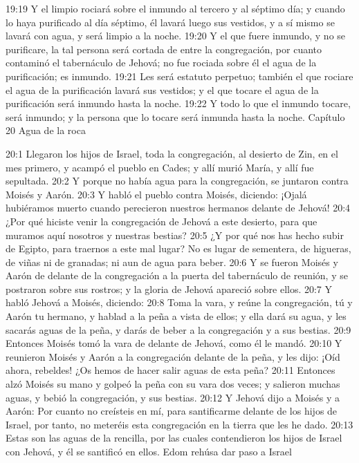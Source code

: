 19:19 Y el limpio rociará sobre el inmundo al tercero y al séptimo día; y cuando lo haya purificado al día séptimo, él lavará luego sus vestidos, y a sí mismo se lavará con agua, y será limpio a la noche.  
19:20 Y el que fuere inmundo, y no se purificare, la tal persona será cortada de entre la congregación, por cuanto contaminó el tabernáculo de Jehová; no fue rociada sobre él el agua de la purificación; es inmundo.  
19:21 Les será estatuto perpetuo; también el que rociare el agua de la purificación lavará sus vestidos; y el que tocare el agua de la purificación será inmundo hasta la noche.  
19:22 Y todo lo que el inmundo tocare, será inmundo; y la persona que lo tocare será inmunda hasta la noche.  
Capítulo 20
Agua de la roca  

20:1 Llegaron los hijos de Israel, toda la congregación, al desierto de Zin, en el mes primero, y acampó el pueblo en Cades; y allí murió María, y allí fue sepultada.  
20:2 Y porque no había agua para la congregación, se juntaron contra Moisés y Aarón.  
20:3 Y habló el pueblo contra Moisés, diciendo: ¡Ojalá hubiéramos muerto cuando perecieron nuestros hermanos delante de Jehová!  
20:4 ¿Por qué hiciste venir la congregación de Jehová a este desierto, para que muramos aquí nosotros y nuestras bestias?  
20:5 ¿Y por qué nos has hecho subir de Egipto, para traernos a este mal lugar? No es lugar de sementera, de higueras, de viñas ni de granadas; ni aun de agua para beber.  
20:6 Y se fueron Moisés y Aarón de delante de la congregación a la puerta del tabernáculo de reunión, y se postraron sobre sus rostros; y la gloria de Jehová apareció sobre ellos.  
20:7 Y habló Jehová a Moisés, diciendo:  
20:8 Toma la vara, y reúne la congregación, tú y Aarón tu hermano, y hablad a la peña a vista de ellos; y ella dará su agua, y les sacarás aguas de la peña, y darás de beber a la congregación y a sus bestias.  
20:9 Entonces Moisés tomó la vara de delante de Jehová, como él le mandó.  
20:10 Y reunieron Moisés y Aarón a la congregación delante de la peña, y les dijo: ¡Oíd ahora, rebeldes! ¿Os hemos de hacer salir aguas de esta peña?  
20:11 Entonces alzó Moisés su mano y golpeó la peña con su vara dos veces; y salieron muchas aguas, y bebió la congregación, y sus bestias.  
20:12 Y Jehová dijo a Moisés y a Aarón: Por cuanto no creísteis en mí, para santificarme delante de los hijos de Israel, por tanto, no meteréis esta congregación en la tierra que les he dado.  
20:13 Estas son las aguas de la rencilla, por las cuales contendieron los hijos de Israel con Jehová, y él se santificó en ellos.  
Edom rehúsa dar paso a Israel  

